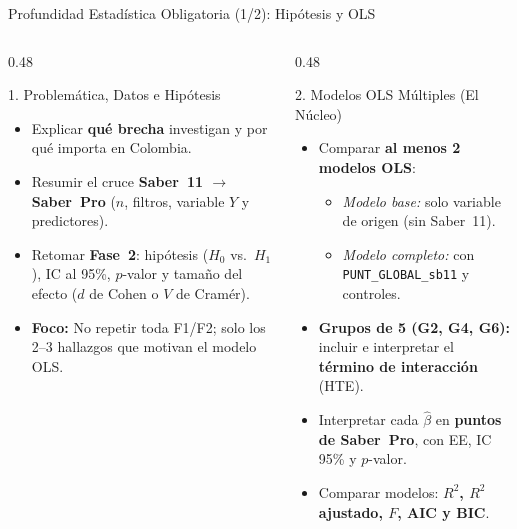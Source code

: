 \documentclass[aspectratio=169, 10pt]{beamer}
\begin{document}
\begin{frame}{Profundidad Estad\'istica Obligatoria (1/2): Hip\'otesis y OLS}
  \begin{columns}[T]
    \begin{column}{0.48\textwidth}
      \begin{block}{1. Problem\'atica, Datos e Hip\'otesis}
        \small
        \begin{itemize}\setlength{\itemsep}{3pt}
          \item Explicar \textbf{qu\'e brecha} investigan y por qu\'e importa en Colombia.
          \item Resumir el cruce \textbf{Saber~11 $\rightarrow$ Saber~Pro} ($n$, filtros, variable $Y$ y predictores).
          \item Retomar \textbf{Fase~2}: hip\'otesis ($H_0$ vs.\ $H_1$), IC al 95\%, $p$-valor y tama\~no del efecto ($d$ de Cohen o $V$ de Cram\'er).
          \item \textbf{Foco:} No repetir toda F1/F2; solo los 2--3 hallazgos que motivan el modelo OLS.
        \end{itemize}
      \end{block}
    \end{column}
    \begin{column}{0.48\textwidth}
      \begin{block}{2. Modelos OLS M\'ultiples (El N\'ucleo)}
        \small
        \begin{itemize}\setlength{\itemsep}{3pt}
          \item Comparar \textbf{al menos 2 modelos OLS}:
            \begin{itemize}\setlength{\itemsep}{1pt}
              \footnotesize
              \item \textit{Modelo base:} solo variable de origen (sin Saber~11).
              \item \textit{Modelo completo:} con \texttt{PUNT\_GLOBAL\_sb11} y controles.
            \end{itemize}
          \item \textbf{Grupos de 5 (G2, G4, G6):} incluir e interpretar el \textbf{t\'ermino de interacci\'on} (HTE).
          \item Interpretar cada $\hat{\beta}$ en \textbf{puntos de Saber~Pro}, con EE, IC 95\% y $p$-valor.
          \item Comparar modelos: \textbf{$R^2$, $R^2$ ajustado, $F$, AIC y BIC}.
        \end{itemize}
      \end{block}
    \end{column}
  \end{columns}
\end{frame}
\end{document}
